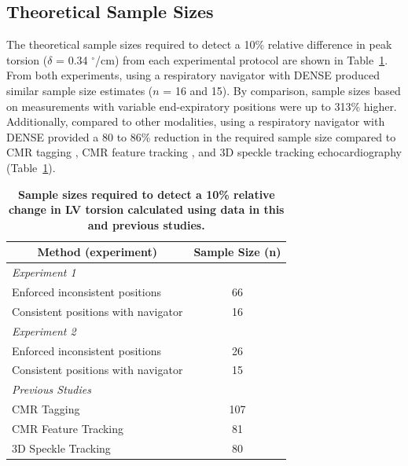 \subsection{Theoretical Sample Sizes}
	The theoretical sample sizes required to detect a 10\% relative difference in peak torsion ($\delta$ = 0.34 $^{\circ}$/cm) from each experimental protocol are shown in Table~\ref{table:samplesize}. From both experiments, using a respiratory navigator with DENSE produced similar sample size estimates ($n$ = 16 and 15). By comparison, sample sizes based on measurements with variable end-expiratory positions were up to 313\% higher. Additionally, compared to other modalities, using a respiratory navigator with DENSE provided a 80 to 86\% reduction in the required sample size compared to CMR tagging \cite{Donekal2013a}, CMR feature tracking \cite{Kowallick2016}, and 3D speckle tracking echocardiography \cite{Kaku2014a} (Table~\ref{table:samplesize}).

	\begin{table}
		\centering
		\caption[Mean ($\pm$ standard deviation) of torsion across the volunteers within each experiment]{\textbf{Sample sizes required to detect a 10\% relative change in LV torsion calculated using data in this and previous studies.}}
		\label{table:samplesize}
		\begin{tabular}{c  c}
			\toprule
			\multicolumn{1}{c}{\textbf{Method (experiment)}}       			& \multicolumn{1}{c}{\textbf{Sample Size (n)}} \\ \midrule
			\multicolumn{1}{l}{\textit{Experiment 1}}                       & \multicolumn{1}{c}{}                         \\
			\multicolumn{1}{l}{\qquad Enforced inconsistent positions}      & 66          								   \\
			\multicolumn{1}{l}{\qquad Consistent positions with navigator}  & 16		   								   \\
			\multicolumn{1}{l}{\textit{Experiment 2}}                       & \multicolumn{1}{c}{}        				   \\
			\multicolumn{1}{l}{\qquad Enforced inconsistent positions}      & 26   		   								   \\
			\multicolumn{1}{l}{\qquad Consistent positions with navigator}  & 15     	   								   \\
			\multicolumn{1}{l}{\textit{Previous Studies}}                   & \multicolumn{1}{c}{}        				   \\
			\multicolumn{1}{l}{\qquad CMR Tagging \cite{Donekal2013a}}      & 107   		   							   \\
			\multicolumn{1}{l}{\qquad CMR Feature Tracking \cite{Kowallick2016}}  & 81     	   						   \\    
			\multicolumn{1}{l}{\qquad 3D Speckle Tracking \cite{Kaku2014a}}  & 80     	   						   \\           
			\bottomrule                       
		\end{tabular}
	\end{table}

